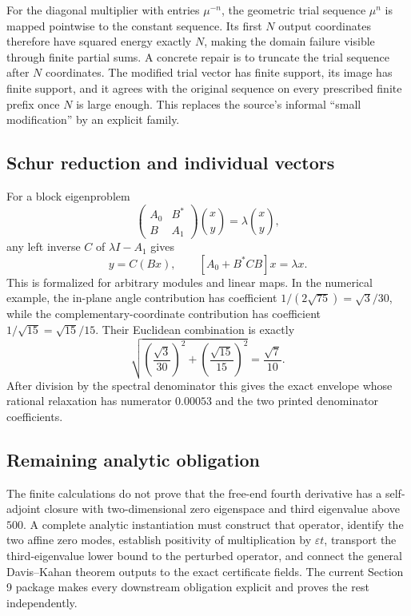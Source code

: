 For the diagonal multiplier with entries $\mu^{-n}$, the geometric trial
sequence $\mu^n$ is mapped pointwise to the constant sequence.  Its first $N$
output coordinates therefore have squared energy exactly $N$, making the
domain failure visible through finite partial sums.  A concrete repair is to
truncate the trial sequence after $N$ coordinates.  The modified trial vector
has finite support, its image has finite support, and it agrees with the
original sequence on every prescribed finite prefix once $N$ is large enough.
This replaces the source's informal ``small modification'' by an explicit
family.

\subsection{Schur reduction and individual vectors}

For a block eigenproblem
\[
 \begin{pmatrix}A_0&B^*\\B&A_1\end{pmatrix}
 \binom{x}{y}=\lambda\binom{x}{y},
\]
any left inverse $C$ of $\lambda I-A_1$ gives
\[
 y=C(Bx),\qquad
 [A_0+B^*CB]x=\lambda x.
\]
This is formalized for arbitrary modules and linear maps.  In the numerical
example, the in-plane angle contribution has coefficient
$1/(2\sqrt{75})=\sqrt3/30$, while the complementary-coordinate contribution
has coefficient $1/\sqrt{15}=\sqrt{15}/15$.  Their Euclidean combination is
exactly
\[
 \sqrt{\left(\frac{\sqrt3}{30}\right)^2+
       \left(\frac{\sqrt{15}}{15}\right)^2}
 =\frac{\sqrt7}{10}.
\]
After division by the spectral denominator this gives the exact envelope whose
rational relaxation has numerator $0.00053$ and the two printed denominator
coefficients.

\subsection{Remaining analytic obligation}

The finite calculations do not prove that the free-end fourth derivative has a
self-adjoint closure with two-dimensional zero eigenspace and third eigenvalue
above $500$.  A complete analytic instantiation must construct that operator,
identify the two affine zero modes, establish positivity of multiplication by
$\varepsilon t$, transport the third-eigenvalue lower bound to the perturbed
operator, and connect the general Davis--Kahan theorem outputs to the exact
certificate fields.  The current Section 9 package makes every downstream
obligation explicit and proves the rest independently.
